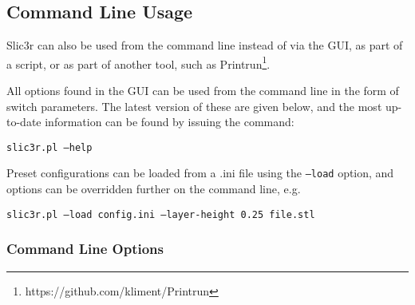 
\subsection{Command Line Usage} %
\label{sec:command_line_usage}

Slic3r can also be used from the command line instead of via the GUI, as part of a script, or as part of another tool, such as Printrun\footnote{https://github.com/kliment/Printrun}.

All options found in the GUI can be used from the command line in the form of switch parameters.  The latest version of these are given below, and the most up-to-date information can be found by issuing the command: \par\texttt{slic3r.pl --help}

Preset configurations can be loaded from a .ini file using the \texttt{--load} option, and options can be overridden further on the command line, e.g. \par\texttt{slic3r.pl --load config.ini --layer-height 0.25 file.stl}

\subsubsection{Command Line Options} %
\label{sub:command_line_options}

